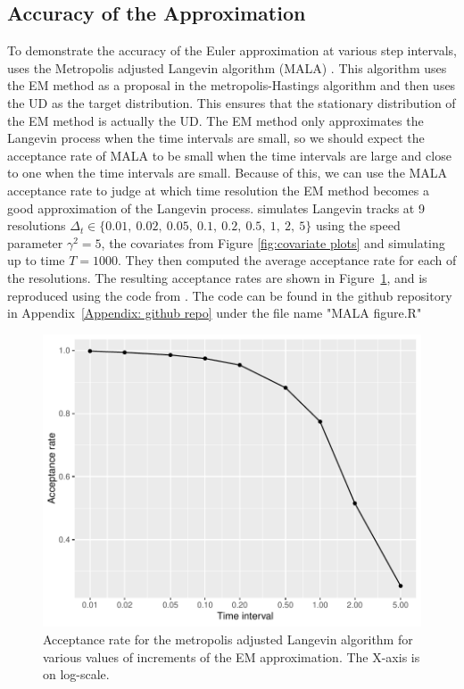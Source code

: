 \subsection{Accuracy of the Approximation}
To demonstrate the accuracy of the Euler approximation at various step intervals, \textcite{michelot_langevin_2019} uses the Metropolis adjusted Langevin algorithm (MALA) \parencite{roberts_exponential_1996}. This algorithm uses the EM method as a proposal in the metropolis-Hastings algorithm and then uses the UD as the target distribution. This ensures that the stationary distribution of the EM method is actually the UD. The EM method only approximates the Langevin process when the time intervals are small, so we should expect the acceptance rate of MALA to be small when the time intervals are large and close to one when the time intervals are small. Because of this, we can use the MALA acceptance rate to judge at which time resolution the EM method becomes a good approximation of the Langevin process. \textcite{michelot_langevin_2019} simulates Langevin tracks at 9 resolutions $\Delta_t\in \{ 0.01, \ 0.02, \ 0.05, \ 0.1, \ 0.2, \ 0.5, \ 1, \ 2, \ 5 \}$ using the speed parameter $\gamma^2 = 5$, the covariates from Figure \ref{fig:covariate plots} and simulating up to time $T=1000$. They then computed the average acceptance rate for each of the resolutions. The resulting acceptance rates are shown in Figure~\ref{fig:MALA}, and is reproduced using the code from \textcite{michelot_langevin_2019}. The code can be found in the github repository in Appendix~\ref{Appendix: github repo} under the file name "MALA figure.R"

\begin{figure}[H]
    \centering
    \includegraphics[width=\linewidth]{Images/background/MALArates.pdf}
    \caption[MALA acceptance rates]{Acceptance rate for the metropolis adjusted Langevin algorithm for various values of increments of the EM approximation. The X-axis is on log-scale.}
    \label{fig:MALA}
\end{figure}


